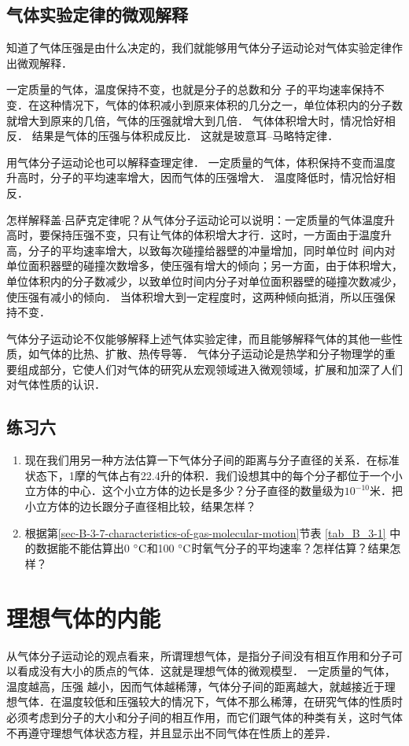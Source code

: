 \subsection{气体实验定律的微观解释} 
知道了气体压强是由什么决定的，我们就能够用气体分子运动论对气体实验定律作出微观解释．

一定质量的气体，温度保持不变，也就是分子的总数和分
子的平均速率保持不变．在这种情况下，气体的体积减小到原来体积的几分之一，单位体积内的分子数就增大到原来的几倍，气体的压强就增大到几倍．
气体体积增大时，情况恰好相反．
结果是气体的压强与体积成反比．
这就是玻意耳--马略特定律．

用气体分子运动论也可以解释查理定律．
一定质量的气体，体积保持不变而温度升高时，分子的平均速率增大，因而气体的压强增大．
温度降低时，情况恰好相反．

怎样解释盖$\cdot$吕萨克定律呢？从气体分子运动论可以说明：一定质量的气体温度升高时，要保持压强不变，只有让气体的体积增大才行．这时，一方面由于温度升高，分子的平均速率增大，以致每次碰撞给器壁的冲量增加，同时单位时
间内对单位面积器壁的碰撞次数增多，使压强有增大的倾向；另一方面，由于体积增大，单位体积内的分子数减少，以致单位时间内分子对单位面积器壁的碰撞次数减少，使压强有减小的倾向．
当体积增大到一定程度时，这两种倾向抵消，所以压强保持不变．

气体分子运动论不仅能够解释上述气体实验定律，而且能够解释气体的其他一些性质，如气体的比热、扩散、热传导等．
气体分子运动论是热学和分子物理学的重要组成部分，它使人们对气体的研究从宏观领域进入微观领域，扩展和加深了人们对气体性质的认识．


\subsection*{练习六}

\begin{enumerate}
    \item 现在我们用另一种方法估算一下气体分子间的距离与分子直径的关系．在标准状态下，1摩的气体占有22.4升的体积．我们设想其中的每个分子都位于一个小立方体的中心．这个小立方体的边长是多少？分子直径的数量级为$10^{-10}$米．把小立方体的边长跟分子直径相比较，结果怎样？
\item 根据第\ref{sec-B-3-7-characteristics-of-gas-molecular-motion}节表 \ref{tab_B_3-1} 中的数据能不能估算出0$\;{}^\circ\text{C}$和100$\;{}^\circ\text{C}$时氧气分子的平均速率？怎样估算？结果怎样？
\end{enumerate}

\section{理想气体的内能}
从气体分子运动论的观点看来，所谓理想气体，是指分子间没有相互作用和分子可以看成没有大小的质点的气体．这就是理想气体的微观模型．
一定质量的气体，温度越高，压强
越小，因而气体越稀薄，气体分子间的距离越大，就越接近于理想气体．在温度较低和压强较大的情况下，气体不那么稀薄，在研究气体的性质时必须考虑到分子的大小和分子间的相互作用，而它们跟气体的种类有关，这时气体不再遵守理想气体状态方程，并且显示出不同气体在性质上的差异．

